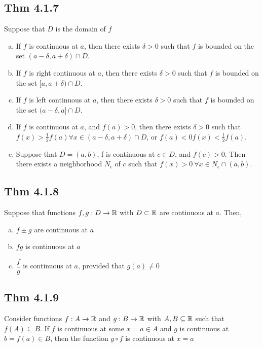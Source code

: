 \subsection*{Thm 4.1.7}
    Suppose that $D$ is the domain of $f$
    \begin{enumerate}[(a)]
	\item If $f$ is continuous at $a$, then there exists $\delta > 0$ such that $f$ is bounded on the set $(a - \delta, a + \delta) \cap D$.
	\item If $f$ is right continuous at $a$, then there exists $\delta > 0$ such that $f$ is bounded on the set $[a, a + \delta) \cap D$.
	\item If $f$ is left continuous at $a$, then there exists $\delta > 0$ such that $f$ is bounded on the set $(a - \delta, a] \cap D$.
	\item If $f$ is continuous at $a$, and $f(a) > 0$, then there exists $\delta > 0$ such that $f(x) > \frac{1}{2} f(a) \forall x \in (a - \delta, a + \delta) \cap D$, or $f(a) < 0 f(x) < \frac{1}{2} f(a)	.$
	\item Suppose that $D = (a, b)$, f is continuous at $c \in  D$, and $f (c) > 0$. Then there exists a neighborhood $N_{\epsilon}$ of $c$ such that $f (x) > 0 \  \forall x \in N_{\epsilon} \cap (a, b)$.

    \end{enumerate}
\subsection*{Thm 4.1.8}
    Suppose that functions $f, g : D \to \mathbb{R}$ with $D \subset \mathbb{R}$ are continuous at $a$. Then,
    \begin{enumerate}[(a)]
        \item $f \pm g$ are continuous at $ a$
	\item $fg$ is continuous at $a$ 
	\item $ \dfrac{f}{g} $ is continuous at $a$, provided that $g(a) \not= 0$
    \end{enumerate}

\subsection*{Thm 4.1.9}
    Consider functions $f : A \to \mathbb{R}$ and $g : B \to \mathbb{R}$ with $A, B \subseteq \mathbb{R}$ such that $f (A) \subseteq B$. If $f$ is continuous at some $x = a \in A$ and $g$ is continuous at $b = f (a) \in B$, then the function $g \circ f$ is continuous at $x = a$

